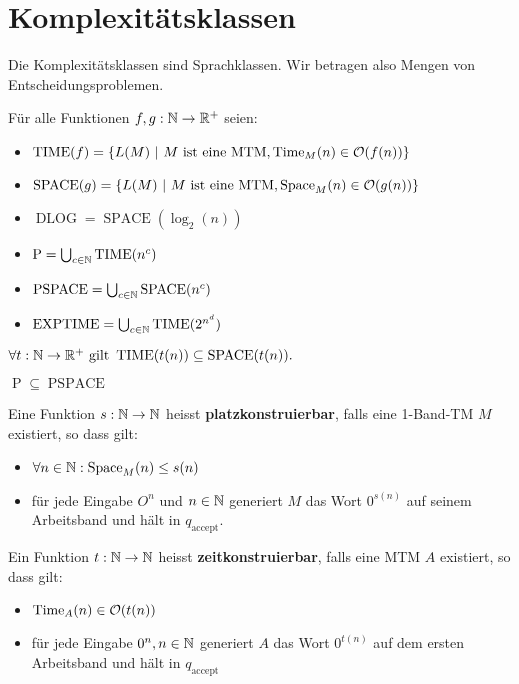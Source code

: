 \section{Komplexitätsklassen}
Die Komplexitätsklassen sind Sprachklassen. Wir betragen also Mengen von Entscheidungsproblemen.

\begin{definition}
Für alle Funktionen \(f, g: \mathbb{N} \to \mathbb{R}^+\) seien:
\begin{itemize}
  \item \( \operatorname{TIME}(f) = \{ L(M) \ |\ M \text{ ist eine MTM}, \Time_M(n) \in \mathcal{O}(f(n)) \} \)
  \item \( \operatorname{SPACE}(g) = \{ L(M) \ |\ M \text{ ist eine MTM}, \Space_M(n) \in \mathcal{O}(g(n)) \} \)
  \item \( \operatorname{DLOG} = \operatorname{SPACE}(\log_2(n)) \)
  \item \( \operatorname{P} = \bigcup_{c \in \mathbb{N}} \operatorname{TIME}(n^c) \)
  \item \( \operatorname{PSPACE} = \bigcup_{c \in \mathbb{N}} \operatorname{SPACE}(n^c) \)
  \item \( \operatorname{EXPTIME} = \bigcup_{c \in \mathbb{N}} \operatorname{TIME}(2^{n^d}) \)\\
\end{itemize}
\end{definition}

\begin{lemma}
\(
  \forall t: \mathbb{N} \to \mathbb{R}^+ \text{ gilt } \operatorname{TIME}(t(n)) \subseteq \operatorname{SPACE}(t(n)).
\)\\
\end{lemma}

\begin{corollary}
\( \operatorname{P} \subseteq \operatorname{PSPACE} \)\\
\end{corollary}

\begin{definition}
Eine Funktion \(s: \mathbb{N} \to \mathbb{N}\) heisst \textbf{platzkonstruierbar}, falls eine 1-Band-TM \(M\) existiert, so dass gilt:
\begin{itemize}
  \item \(\forall n \in \mathbb{N}: \operatorname{Space}_M(n) \leq s(n)\)
  \item für jede Eingabe \(O^n\) und \(n \in \mathbb{N}\) generiert \(M\) das Wort \(0^{s(n)}\) auf seinem Arbeitsband und hält in \(q_\text{accept}\).
\end{itemize}
\end{definition}

\begin{definition}
Ein Funktion \(t: \mathbb{N} \to \mathbb{N}\) heisst \textbf{zeitkonstruierbar}, falls eine MTM \(A\) existiert, so dass gilt:
\begin{itemize}
  \item \( \operatorname{Time}_A(n) \in \mathcal{O}(t(n))\)
  \item für jede Eingabe \(0^n, n \in \mathbb{N}\) generiert \(A\) das Wort \(0^{t(n)}\) auf dem ersten Arbeitsband und hält in \(q_\text{accept}\)\\
\end{itemize}
\end{definition}

